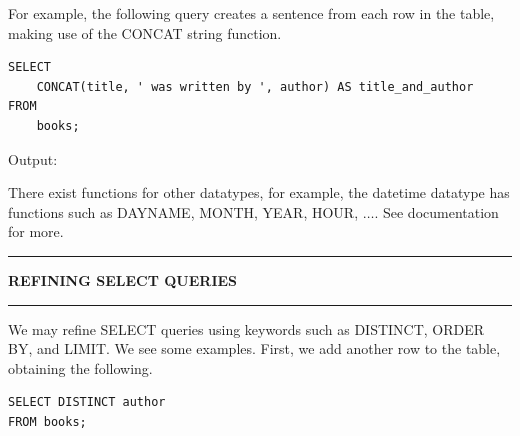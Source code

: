\documentclass[8pt]{extarticle}
\newcommand{\heading}[1]{%
    \noindent
    \rule{\linewidth}{0.4pt}
    \begin{center}
        \vspace{-1ex}
        \textbf{#1}        
        \vspace{-2.5ex}
    \end{center}
    \rule{\linewidth}{0.4pt}
}
\begin{document}
\begin{multicols}{4}
For example, the following query creates a sentence from each row in the table, making use of the CONCAT string function. 

\vspace{0.5ex}
\begin{lstlisting}[style=sql]
SELECT 
    CONCAT(title, ' was written by ', author) AS title_and_author
FROM
    books;
\end{lstlisting}
\vspace{1ex}

Output:

\vspace{2ex}
\vspace*{2ex}

There exist functions for other datatypes, for example, the datetime datatype has functions such as DAYNAME, MONTH, YEAR, HOUR, $\ldots$. See documentation for more.
\vspace{1ex}

\heading{REFINING SELECT QUERIES}

We may refine SELECT queries using keywords such as DISTINCT, ORDER BY, and LIMIT. We see some examples. First, we add another row to the table, obtaining the following. 

\vspace{1.5ex}
\vspace*{0.5ex}

\vspace{0.5ex}
\begin{lstlisting}[style=sql]
SELECT DISTINCT author
FROM books;
\end{lstlisting}
\vspace{0.5ex}


\end{multicols}
\end{document}
